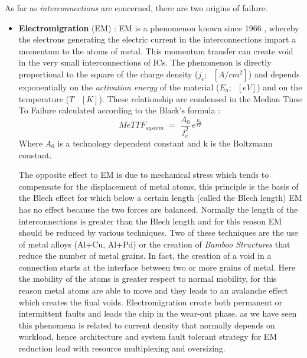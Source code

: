{{{			As far as \textit{interconnections} are concerned, there are two origins of failure:
			\begin{itemize}
				\item \textbf{Electromigration} (EM) : EM is a phenomenon known since 1966 , whereby the electrons generating the electric current in the interconnections impart a momentum to the atoms of metal. This momentum transfer can create void in the very small interconnections of ICs. The phenomenon is directly proportional to the square of the charge density ($j_e;\;\; [A/cm^2]$) and depends exponentially on the \textit{activation energy} of the material ($E_a;\;\;[eV]$) and on the temperature ($T \;\;\;[K]$). These relationship are condensed in the Median Time To Failure calculated according to the Black's formula :	
				\begin{equation}
					MeTTF_{system} \;=\; \frac{A_0}{j_e^2}\,e^{\frac{E_a}{kT}} 
				\end{equation}
				Where $A_0$ is a technology dependent constant and k is the Boltzmann constant. 
				
				The opposite effect to EM is due to mechanical stress which tends to compensate for the displacement of metal atoms, this principle is the basis of the Blech effect for which below a certain length (called the Blech length) EM has no effect because the two forces are balanced. Normally the length of the interconnections is greater than the Blech length and for this reason EM should be reduced by various techniques. Two of these techniques are the use of metal alloys (Al+Cu, Al+Pd) or the creation of \textit{Bamboo Structures} that reduce the number of metal grains. In fact, the creation of a void in a connection starts at the interface between two or more grains of metal. Here the mobility of the atoms is greater respect to normal mobility, for this reason metal atoms are able to move  and they leads to an avalanche effect which creates the final voids.					
				Electromigration create both permanent or intermittent faults and leads the chip in the wear-out phase. as we have seen this phenomena is related to current density that normally depends on workload, hence architecture and system fault tolerant strategy for EM reduction lead with resource multiplexing and oversizing.
				

\end{itemize}}}}
